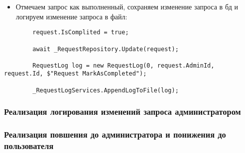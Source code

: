\begin{itemize}
	\item{Отмечаем запрос как выполненный, сохраняем изменение запроса в бд и логируем изменение запроса в файл:}
\end{itemize}
\begin{verbatim}
        request.IsComplited = true;

        await _RequestRepository.Update(request);

        RequestLog log = new RequestLog(0, request.AdminId, request.Id, $"Request MarkAsCompleted");

        _RequestLogServices.AppendLogToFile(log);
\end{verbatim}


\subsubsection{Реализация логирования изменений запроса администратором}

\subsubsection{Реализация повшения до администратора и понижения до пользователя}
